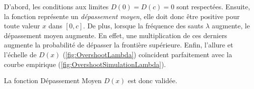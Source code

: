 D'abord, les conditions aux limites $D(0)=D(c)=0$ sont respectées. Ensuite, la fonction représente un \textit{dépassement moyen}, elle doit donc être positive pour toute valeur $x$ dans $[0,c]$. De plus, lorsque la fréquence des sauts \(\lambda\) augmente, le dépassement moyen augmente. En effet, une multiplication de ces derniers augmente la probabilité de dépasser la frontière supérieure. Enfin, l'allure et l'échelle de \(D(x)\) (\ref{fig:OvershootLambda}) coïncident parfaitement avec la courbe empirique (\ref{fig:OvershootSimulationLambda}). 

La fonction Dépassement Moyen $D(x)$ est donc validée.